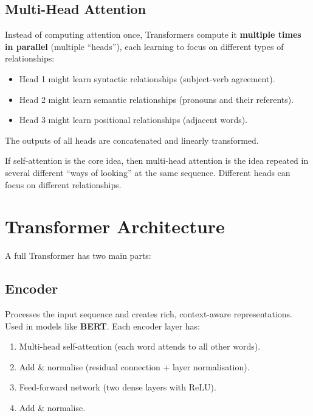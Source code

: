 \documentclass[12pt, a4paper, oneside]{book}
\begin{document}
\subsection{Multi-Head Attention}

Instead of computing attention once, Transformers compute it \textbf{multiple times in parallel} (multiple ``heads''), each learning to focus on different types of relationships:
\begin{itemize}[leftmargin=2em]
    \item Head 1 might learn syntactic relationships (subject-verb agreement).
    \item Head 2 might learn semantic relationships (pronouns and their referents).
    \item Head 3 might learn positional relationships (adjacent words).
\end{itemize}

The outputs of all heads are concatenated and linearly transformed.

\begin{intuitionbox}
If self-attention is the core idea, then multi-head attention is the idea repeated in several different ``ways of looking'' at the same sequence. Different heads can focus on different relationships.
\end{intuitionbox}

\section{Transformer Architecture}

A full Transformer has two main parts:

\subsection{Encoder}

Processes the input sequence and creates rich, context-aware representations. Used in models like \textbf{BERT}. Each encoder layer has:
\begin{enumerate}[leftmargin=2em]
    \item Multi-head self-attention (each word attends to all other words).
    \item Add \& normalise (residual connection + layer normalisation).
    \item Feed-forward network (two dense layers with ReLU).
    \item Add \& normalise.
\end{enumerate}
\end{document}
